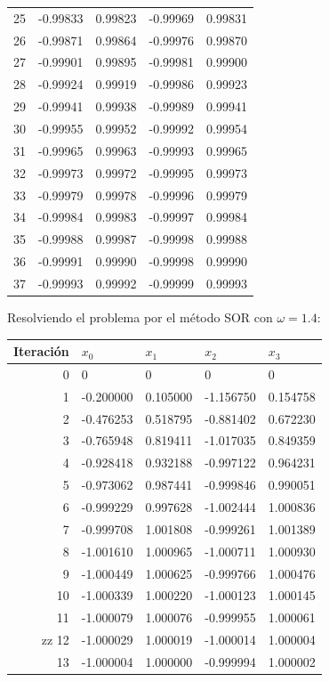 \begin{itemize}
\begin{center}
\begin{tabular}{r|llll}
        25 & -0.99833 & 0.99823 & -0.99969 & 0.99831 \\
        26 & -0.99871 & 0.99864 & -0.99976 & 0.99870 \\
        27 & -0.99901 & 0.99895 & -0.99981 & 0.99900 \\
        28 & -0.99924 & 0.99919 & -0.99986 & 0.99923 \\
        29 & -0.99941 & 0.99938 & -0.99989 & 0.99941 \\
        30 & -0.99955 & 0.99952 & -0.99992 & 0.99954 \\
        31 & -0.99965 & 0.99963 & -0.99993 & 0.99965 \\
        32 & -0.99973 & 0.99972 & -0.99995 & 0.99973 \\
        33 & -0.99979 & 0.99978 & -0.99996 & 0.99979 \\
        34 & -0.99984 & 0.99983 & -0.99997 & 0.99984 \\
        35 & -0.99988 & 0.99987 & -0.99998 & 0.99988 \\
        36 & -0.99991 & 0.99990 & -0.99998 & 0.99990 \\
        37 & -0.99993 & 0.99992 & -0.99999 & 0.99993 \\
    \end{tabular}
    \end{center}

Resolviendo el problema por el método SOR  con  $\omega=1.4$:

    \begin{center}
    \begin{tabular}{r|llll}
        Iteración & $x_0$ & $x_1$ & $x_2$ & $x_3$ \\
        \hline
        0 & 0 & 0 & 0 & 0 \\
        1 & -0.200000 & 0.105000 & -1.156750 & 0.154758 \\
        2 & -0.476253 & 0.518795 & -0.881402 & 0.672230 \\
        3 & -0.765948 & 0.819411 & -1.017035 & 0.849359 \\
        4 & -0.928418 & 0.932188 & -0.997122 & 0.964231 \\
        5 & -0.973062 & 0.987441 & -0.999846 & 0.990051 \\
        6 & -0.999229 & 0.997628 & -1.002444 & 1.000836 \\
        7 & -0.999708 & 1.001808 & -0.999261 & 1.001389 \\
        8 & -1.001610 & 1.000965 & -1.000711 & 1.000930 \\
        9 & -1.000449 & 1.000625 & -0.999766 & 1.000476 \\
        10 & -1.000339 & 1.000220 & -1.000123 & 1.000145 \\
        11 & -1.000079 & 1.000076 & -0.999955 & 1.000061 \\zz
        12 & -1.000029 & 1.000019 & -1.000014 & 1.000004 \\
        13 & -1.000004 & 1.000000 & -0.999994 & 1.000002 \\
    \end{tabular} \\
    \end{center}


\end{itemize}
